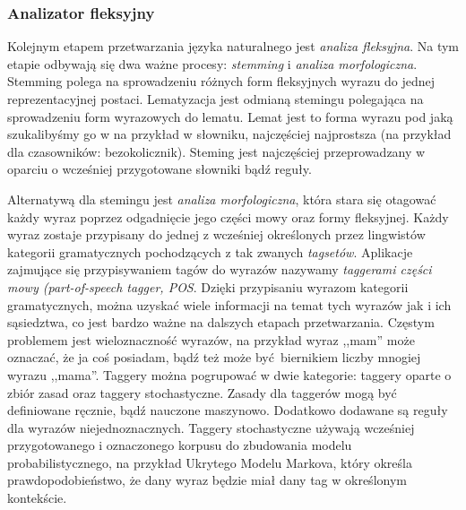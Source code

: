 \documentclass[a4paper, twoside, 12pt]{report}
\begin{document}
            \subsubsection{Analizator fleksyjny}
                Kolejnym etapem przetwarzania języka naturalnego jest \emph{analiza fleksyjna}. Na tym etapie odbywają się dwa
                ważne procesy: \emph{stemming} i \emph{analiza morfologiczna}. Stemming polega na sprowadzeniu różnych form fleksyjnych wyrazu do jednej
                reprezentacyjnej postaci. Lematyzacja jest odmianą stemingu polegająca na sprowadzeniu form wyrazowych do lematu.
                Lemat jest to forma wyrazu pod jaką szukalibyśmy go w na przykład w słowniku, najczęściej najprostsza
                (na przykład dla czasowników: bezokolicznik). Steming jest najczęściej przeprowadzany w oparciu o wcześniej
                przygotowane słowniki bądź reguły.

                Alternatywą dla stemingu jest \emph{analiza morfologiczna}, która stara się otagować każdy wyraz poprzez odgadnięcie
                jego części mowy oraz formy fleksyjnej. Każdy wyraz zostaje przypisany do jednej z wcześniej określonych
                przez lingwistów kategorii gramatycznych pochodzących z tak zwanych \emph{tagsetów}. Aplikacje zajmujące
                się przypisywaniem tagów do wyrazów nazywamy \emph{taggerami części mowy (part-of-speech tagger, POS}. Dzięki przypisaniu
                wyrazom kategorii gramatycznych, można uzyskać wiele informacji na temat tych wyrazów jak i ich sąsiedztwa,
                co jest bardzo ważne na dalszych etapach przetwarzania. Częstym problemem jest wieloznaczność wyrazów, na przykład
                wyraz ,,mam'' może oznaczać, że ja coś posiadam, bądź też może być biernikiem liczby mnogiej wyrazu ,,mama''.
                Taggery można pogrupować w dwie kategorie: taggery oparte o zbiór zasad oraz taggery stochastyczne. Zasady
                dla taggerów mogą być definiowane ręcznie, bądź nauczone maszynowo. Dodatkowo dodawane są reguły dla wyrazów
                niejednoznacznych. Taggery stochastyczne używają wcześniej przygotowanego i oznaczonego korpusu do zbudowania
                modelu probabilistycznego, na przykład Ukrytego Modelu Markova, który określa prawdopodobieństwo, że dany
                wyraz będzie miał dany tag w określonym kontekście\cite{SPEECHANDLANGUAGEPROCESSING}.
\end{document}
